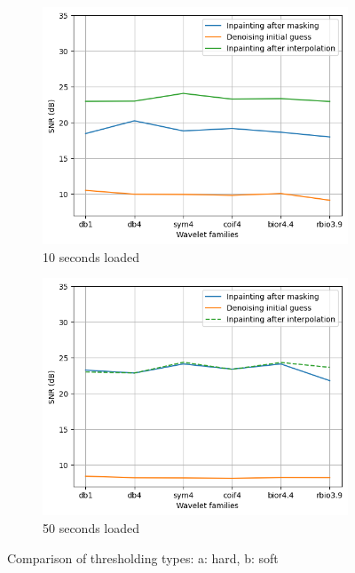 \documentclass[a4paper]{article}
\begin{document}
\begin{figure}[htb]
	\centering %
	\begin{subfigure}{0.4\textwidth}
		\includegraphics[width=\linewidth]{Images/Hardthresholding_letterO.png}
		\caption{10 seconds loaded}
		\label{fig:1}
	\end{subfigure}\hfil %
	\begin{subfigure}{0.4\textwidth}
		\includegraphics[width=\linewidth]{Images/Softthresholding_letterO.png}
		\caption{50 seconds loaded}
		\label{fig:2}
	\end{subfigure}\hfil
	\caption{Comparison of thresholding types: a: hard, b: soft}
	\label{softhardinpainting}
\end{figure}
\end{document}
